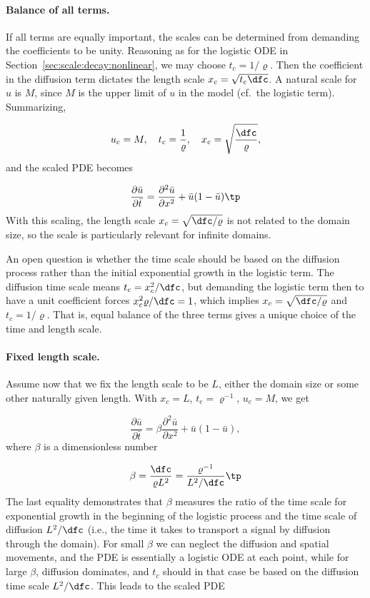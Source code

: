 \documentclass[graybox,envcountchap,sectrefs,final]{svmonodo}
\begin{document}
\paragraph{Balance of all terms.}
If all terms are equally important, the scales can be determined from
demanding the coefficients to be unity.
Reasoning as for the logistic ODE in Section~\ref{sec:scale:decay:nonlinear},
we may choose $t_c=1/\varrho$. Then
the coefficient in the diffusion term dictates the length scale $x_c =
\sqrt{t_c\dfc}$.
A natural scale for $u$ is $M$, since $M$ is the upper limit of $u$ in
the model (cf.~the logistic term). Summarizing,

\[ u_c=M,\quad t_c = \frac{1}{\varrho},\quad x_c = \sqrt{\frac{\dfc}{\varrho}},
\]
and the scaled PDE becomes

\begin{equation}
\frac{\partial \bar u}{\partial \bar t} =
\frac{\partial^2 \bar u}{\partial x^2} + \bar u (1 - \bar u)\tp
\end{equation}
With this scaling, the length scale $x_c=\sqrt{\dfc/\varrho}$
is not related to the domain size, so the scale is particularly relevant for
infinite domains.

An open question is whether the time scale should be based on
the diffusion process rather than the initial exponential growth
in the logistic term. The diffusion time scale means $t_c = x_c^2/\dfc$,
but demanding the logistic term then to have a unit coefficient
forces $x_c^2\varrho /\dfc = 1$, which implies $x_c=\sqrt{\dfc/\varrho}$
and $t_c=1/\varrho$. That is, equal balance of the three
terms gives a unique choice of the time and length scale.

\paragraph{Fixed length scale.}
Assume now that we fix the length scale to be $L$, either the
domain size or some other naturally given length. With
$x_c=L$, $t_c=\varrho^{-1}$,
$u_c=M$, we get

\begin{equation}
\frac{\partial \bar u}{\partial \bar t} =
\beta
\frac{\partial^2 \bar u}{\partial x^2} + \bar u (1 - \bar u),
\end{equation}
where $\beta$ is a dimensionless number

\[ \beta = \frac{\dfc}{\varrho L^2} = \frac{\varrho^{-1}}{L^2/\dfc}\tp\]
The last equality demonstrates
that $\beta$ measures the ratio of the time scale
for exponential growth in the beginning of the logistic process
and the time scale of diffusion $L^2/\dfc$ (i.e., the time it takes
to transport a signal by diffusion through the domain).
For small $\beta$ we can neglect the diffusion and spatial movements,
and the PDE is essentially a logistic ODE at each point, while for
large $\beta$, diffusion dominates, and $t_c$ should in that case be
based on the diffusion time scale $L^2/\dfc$. This leads to the
scaled PDE
\end{document}
